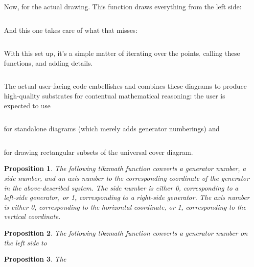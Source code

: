 \documentclass{article}
\newtheorem{prop}{Proposition}
\begin{document}
Now, for the actual drawing.
This function draws everything from the left side:
\inputminted[firstline=70, lastline=98]{tex}{../draw/draw.tex}

And this one takes care of what that misses:
\inputminted[firstline=99, lastline=135]{tex}{../draw/draw.tex}

With this set up, it's a simple matter of iterating over the points, calling these functions,
and adding details.
\inputminted[firstline=136, lastline=144]{tex}{../draw/draw.tex}

The actual user-facing code embellishes and combines these diagrams to produce high-quality substrates
for contentual mathematical reasoning: the user is expected to use
\inputminted[firstline=148, lastline=155]{text}{../draw/draw.tex}
for standalone diagrams (which merely adds generator numberings) and
\inputminted[firstline=157, lastline=175]{tex}{../draw/draw.tex}
for drawing rectangular subsets of the universal cover diagram.


\begin{prop}
  The following tikzmath function converts a generator number, a side number, and an axis number
  to the corresponding coordinate of the generator in the above-described system.
  The side number is either 0, corresponding to a left-side generator, or 1,
  corresponding to a right-side generator.
  The axis number is either 0, corresponding to the horizontal coordinate, or 1,
  corresponding to the vertical coordinate.
\end{prop}

\begin{prop}
  The following tikzmath function converts a generator number on the left side to
\end{prop}

\begin{prop}
  The
\end{prop}
\end{document}
